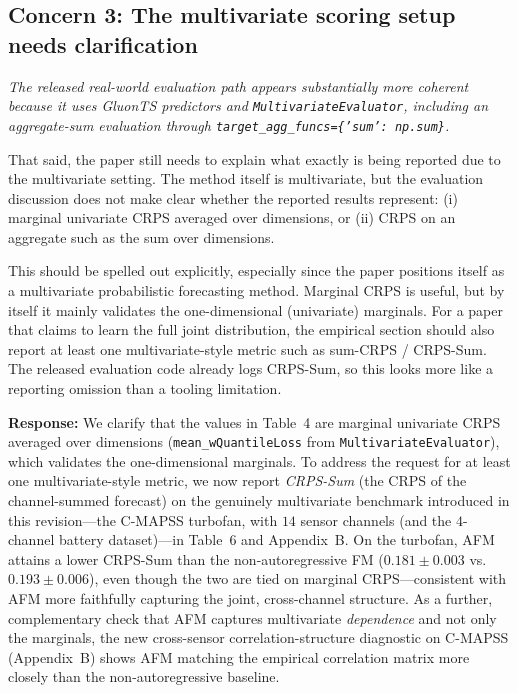 \documentclass[11pt]{article}
\newcommand{\reviewertext}[1]{%
  \begin{reviewerquote}
    {\color{reviewercolor}\itshape #1}
  \end{reviewerquote}%
}
\newcommand{\authorresponse}[1]{%
  \textbf{Response:} #1\par\medskip
}
\begin{document}
\subsection{Concern 3: The multivariate scoring setup needs clarification}

\reviewertext{%
The released real-world evaluation path appears substantially more coherent because it uses GluonTS predictors and \texttt{MultivariateEvaluator}, including an aggregate-sum evaluation through \texttt{target\_agg\_funcs=\{'sum': np.sum\}}.

That said, the paper still needs to explain what exactly is being reported due to the multivariate setting. The method itself is multivariate, but the evaluation discussion does not make clear whether the reported results represent: (i) marginal univariate CRPS averaged over dimensions, or (ii) CRPS on an aggregate such as the sum over dimensions.

This should be spelled out explicitly, especially since the paper positions itself as a multivariate probabilistic forecasting method. Marginal CRPS is useful, but by itself it mainly validates the one-dimensional (univariate) marginals. For a paper that claims to learn the full joint distribution, the empirical section should also report at least one multivariate-style metric such as sum-CRPS / CRPS-Sum. The released evaluation code already logs CRPS-Sum, so this looks more like a reporting omission than a tooling limitation.
}

\authorresponse{%
We clarify that the values in Table~4 are marginal univariate CRPS averaged over dimensions (\texttt{mean\_wQuantileLoss} from \texttt{MultivariateEvaluator}), which validates the one-dimensional marginals. To address the request for at least one multivariate-style metric, we now report \emph{CRPS-Sum} (the CRPS of the channel-summed forecast) on the genuinely multivariate benchmark introduced in this revision---the C-MAPSS turbofan, with $14$ sensor channels (and the $4$-channel battery dataset)---in Table~6 and Appendix~B. On the turbofan, AFM attains a lower CRPS-Sum than the non-autoregressive FM ($0.181\!\pm\!0.003$ vs.\ $0.193\!\pm\!0.006$), even though the two are tied on marginal CRPS---consistent with AFM more faithfully capturing the joint, cross-channel structure. As a further, complementary check that AFM captures multivariate \emph{dependence} and not only the marginals, the new cross-sensor correlation-structure diagnostic on C-MAPSS (Appendix~B) shows AFM matching the empirical correlation matrix more closely than the non-autoregressive baseline.
}
\end{document}
